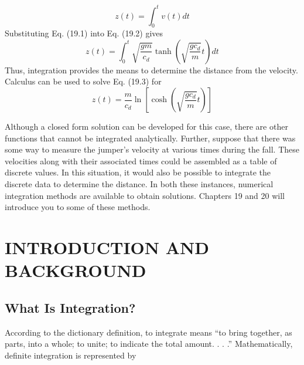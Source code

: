 \documentclass[../main.tex]{subfiles}
\begin{document}
	\begin{equation}
		\tag{19.2}
	z(t)=\int_{0}^{t} v(t) d t
\end{equation}
	Substituting Eq. (19.1) into Eq. (19.2) gives
	\begin{equation}
		\tag{19.3}
	z(t)=\int_{0}^{t} \sqrt{\frac{g m}{c_{d}}} \tanh \left(\sqrt{\frac{g c_{d}}{m}} t\right) d t
\end{equation}
	Thus, integration provides the means to determine the distance from the velocity. Calculus can be used to solve Eq. (19.3) for
	\begin{equation}
		\tag{19.4}
	z(t)=\frac{m}{c_{d}} \ln \left[\cosh \left(\sqrt{\frac{g c_{d}}{m}} t\right)\right]
\end{equation}

Although a closed form solution can be developed for this case, there are other functions that cannot be integrated analytically. Further, suppose that there was some way to
measure the jumper's velocity at various times during the fall. These velocities along with
their associated times could be assembled as a table of discrete values. In this situation, it
would also be possible to integrate the discrete data to determine the distance. In both these
instances, numerical integration methods are available to obtain solutions. Chapters 19 and
20 will introduce you to some of these methods.

\section{INTRODUCTION AND BACKGROUND}

\subsection{What Is Integration?}

According to the dictionary definition, to integrate means “to bring together, as parts, into
a whole; to unite; to indicate the total amount. . . .” Mathematically, definite integration is
represented by
\end{document}
